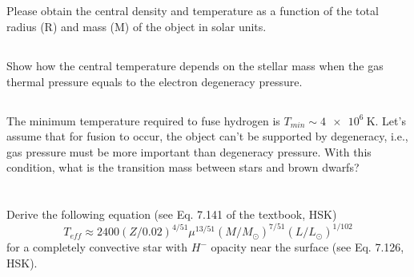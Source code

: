 \subsection{}
Please obtain the central density and temperature as a function of the total
radius (R) and mass (M) of the object in solar units.

\subsection{}
Show how the central temperature depends on the stellar mass when the gas
thermal pressure equals to the electron degeneracy pressure.

\subsection{}
The minimum temperature required to fuse hydrogen is $T_{min}\sim\SI{4e6}{\kelvin}$. Let's
assume that for fusion to occur, the object can't be supported by degeneracy,
i.e., gas pressure must be more important than degeneracy pressure. 
With this condition, what is the transition mass between stars and brown dwarfs?


\section{}
Derive the following equation (see Eq. 7.141 of the textbook, HSK)
\begin{equation}
    T_{eff}\approx 2400(Z/0.02)^{4/51}\mu^{13/51}(M/M_\odot)^{7/51}(L/L_\odot)^{1/102}
\end{equation}
for a completely convective star with $H^{-}$ opacity near the surface (see Eq. 7.126, HSK).



